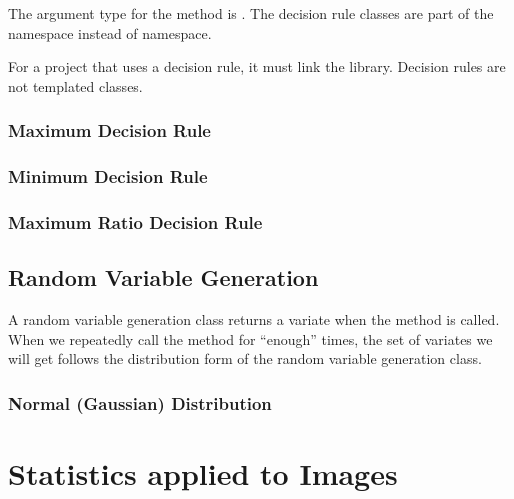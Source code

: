 The argument type for the  method is
. The decision rule classes are part of the
 namespace instead of  namespace.

For a project that uses a decision rule, it must link the 
library. Decision rules are not templated classes.

\subsubsection{Maximum Decision Rule}
\label{sec:MaximumDecisionRule}

\ifitkFullVersion

\fi

\subsubsection{Minimum Decision Rule}
\label{sec:MinimumDecisionRule}

\ifitkFullVersion

\fi

\subsubsection{Maximum Ratio Decision Rule}
\label{sec:MaximumRatioDecisionRule}



\subsection{Random Variable Generation}
\label{sec:RandomVariableGeneration}

A random variable generation class returns a variate when the
 method is called. When we repeatedly call the method
for ``enough'' times, the set of variates we will get follows
the distribution form of the random variable generation class.

\subsubsection{Normal (Gaussian) Distribution}
\label{sec:NormalVariateGeneration}

\ifitkFullVersion

\fi


\section{Statistics applied to Images}
\label{sec:StatisticsAppliedToImages}

